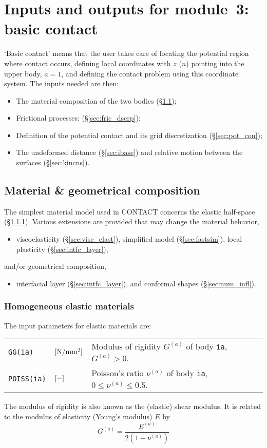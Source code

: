 \documentclass[12pt]{report}
\newcommand{\var}[1]{\mbox{\tt #1}}
\newenvironment{inputvars}{\vspace{0.4\baselineskip}%

\begin{tabular}{>{\raggedright}p{22mm}p{19mm}p{113mm}}}{
\end{tabular}

}
\newcommand{\inpvar}[3]{{\small\tt #1} & $#2$ & #3 \\[1ex]}
\begin{document}
\chapter{Inputs and outputs for module~3: basic contact}
\label{chp:module3}

`Basic contact' means that the user takes care of locating the potential
region where contact occurs, defining local coordinates with $z$ ($n$)
pointing into the upper body, $a=1$, and defining the contact problem using
this coordinate system. The inputs needed are then:
\begin{itemize}
\item The material composition of the two bodies (\S \ref{sec:matcns});
\item Frictional processes: (\S \ref{sec:fric_dscrp});
\item Definition of the potential contact and its grid discretization
        (\S \ref{sec:pot_con});
\item The undeformed distance (\S \ref{sec:ibase}) and relative motion
        between the surfaces (\S \ref{sec:kincns}).
\end{itemize}

\section{Material \& geometrical composition}
\label{sec:matcns}

The simplest material model used in CONTACT concerns the elastic
half-space (\S \ref{sec:lin_elast}). Various extensions are provided
that may change the material behavior,
\begin{itemize}
\item viscoelasticity (\S \ref{sec:visc_elast}), 
        simplified model (\S \ref{sec:fastsim}), 
        local plasticity (\S \ref{sec:intfc_layer}),
\end{itemize}
and/or geometrical composition,
\begin{itemize}
\item interfacial layer (\S \ref{sec:intfc_layer}), and
        conformal shapes (\S \ref{sec:num_infl}).
\end{itemize}

\subsection{Homogeneous elastic materials}
\label{sec:lin_elast}

The input parameters for elastic materials are:
\begin{inputvars}
\inpvar{GG(ia)}{\bunit{N/mm^2}}{Modulus of rigidity $G^{(a)}$ of body \var{ia},
        $G^{(a)} > 0$.}
\inpvar{POISS(ia)}{\bunit{-}}{Poisson's ratio $\nu^{(a)}$ of body \var{ia},
        $0\le\nu^{(a)}\le 0.5$.}
\end{inputvars}
The modulus of rigidity is also known as the (elastic) shear modulus. It is
related to the modulus of elasticity (Young's modulus) $E$ by
\begin{equation}
  G^{(a)} = \frac{E^{(a)}}{2(1+\nu^{(a)})}
\end{equation}
\end{document}
